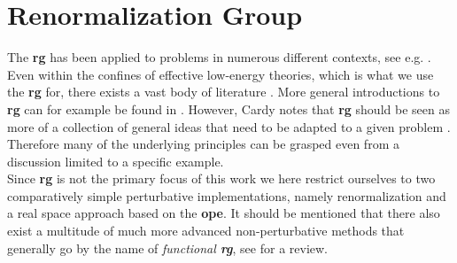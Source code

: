 \documentclass[english, parskip=full]{scrartcl}
\title{\Title}
\author{\Author}
\date{\today}
\renewcommand{\gls}[1]{\textbf{#1}}
\renewcommand{\acrlong}[1]{\textbf{#1}}
\newcommand{\trspace}{real space}
\begin{document}
\maketitle  %

\section{Renormalization Group}\label{chap:rg}
The \gls{rg} has been applied to problems in numerous different contexts, see e.g. \cite[]{RG_Theory_Fisher_1998}.
Even within the confines of effective low-energy theories, which is what we use the \gls{rg} for, there exists a vast body of literature \cite{RG_SG_Wilson_Sharp_vs_Smooth_Kogut_1979,RG_NonPerturbative_Introduction_Delamotte_2012,RG_EFT_lowDim_Yanagisawa_2017}.
More general introductions to \gls{rg} can for example be found in \cite{Cardy_1996,RG_Theory_Fisher_1998}.
However, Cardy notes that \gls{rg} should be seen as more of a collection of general ideas that need to be adapted to a given problem \cite[p.28]{Cardy_1996}.
Therefore many of the underlying principles can be grasped even from a discussion limited to a specific example.\\
Since \gls{rg} is not the primary focus of this work we here restrict ourselves to two comparatively simple perturbative implementations, namely \tms{} renormalization and a \trspace{} approach based on the \acrlong{ope}.
It should be mentioned that there also exist a multitude of much more advanced non-perturbative methods that generally go by the name of \emph{functional \gls{rg}}, see \cite{RG_Wilson_fRG_review_Dupuis_2021} for a review.
\end{document}
